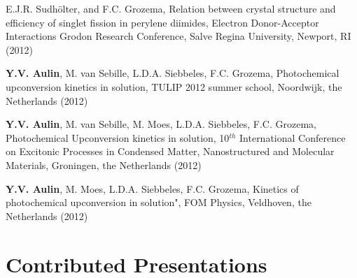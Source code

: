 \documentclass[11pt,letterpaper,sans]{moderncv} %
\begin{document}
\begin{etaremune}
              E.J.R. Sudhölter, and F.C. Grozema, 
              Relation between crystal structure and efficiency
              of singlet fission in perylene diimides,
              Electron Donor-Acceptor Interactions Grodon Research Conference,
              Salve Regina University, Newport, RI (2012)
        \item \textbf{Y.V. Aulin}, M. van Sebille, L.D.A. Siebbeles, F.C. Grozema,
              Photochemical upconversion kinetics in solution,
              TULIP 2012 summer school, Noordwijk, the Netherlands (2012)
        \item \textbf{Y.V. Aulin}, M. van Sebille, M. Moes, L.D.A. Siebbeles, F.C. Grozema,
	      Photochemical Upconversion kinetics in solution,
	      10$^{th}$ International Conference on Excitonic Processes in
	      Condensed Matter, Nanostructured and Molecular Materials, 
	      Groningen, the Netherlands (2012)
	\item \textbf{Y.V. Aulin}, M. Moes, L.D.A. Siebbeles, F.C. Grozema, 
	      Kinetics of photochemical upconversion in solution",
	      FOM Physics, Veldhoven, the Netherlands (2012)
\end{etaremune}




\section {Contributed Presentations}
\end{document}
